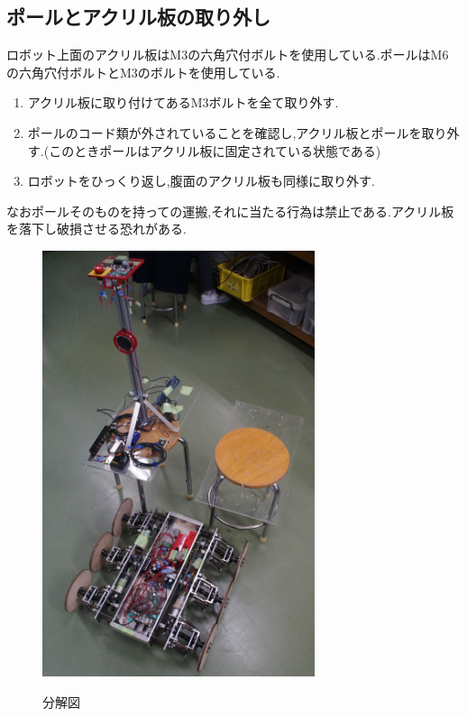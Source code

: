 \subsection{ポールとアクリル板の取り外し}
ロボット上面のアクリル板はM3の六角穴付ボルトを使用している.ポールはM6の六角穴付ボルトとM3のボルトを使用している.

\begin{enumerate}
 \item アクリル板に取り付けてあるM3ボルトを全て取り外す.
 \item ポールのコード類が外されていることを確認し,アクリル板とポールを取り外す.(このときポールはアクリル板に固定されている状態である)
 \item ロボットをひっくり返し,腹面のアクリル板も同様に取り外す.
\end{enumerate}
なおポールそのものを持っての運搬,それに当たる行為は禁止である.アクリル板を落下し破損させる恐れがある.

\begin{figure}[htp]
 \begin{center}
  \includegraphics[width=80mm]{img/hard/f11.jpg}
 　\caption{分解図}
  \label{fig:bunkai1}%
 \end{center}
\end{figure}



